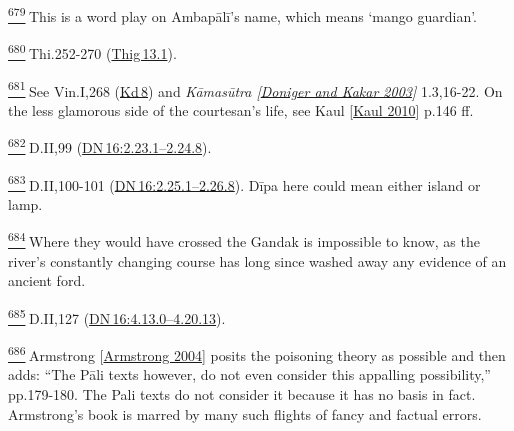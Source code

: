 \label{footprints_split_025.html_fn679}
\hyperref[footprints_split_017.htmlux5cux23fnref679]{\textsuperscript{679}} This
is a word play on Ambapālī's name, which means `mango guardian'.

\label{footprints_split_025.html_fn680}
\hyperref[footprints_split_017.htmlux5cux23fnref680]{\textsuperscript{680}} Thi.252-270
(\href{https://suttacentral.net/thig13.1/en/sujato}{Thig\,13.1}).

\label{footprints_split_025.html_fn681}
\hyperref[footprints_split_017.htmlux5cux23fnref681]{\textsuperscript{681}} See
Vin.I,268
(\href{https://suttacentral.net/pli-tv-kd8/en/brahmali}{Kd\,8}) and
\emph{{Kāmasūtra
{{[}\hyperref[footprints_split_023.htmlux5cux23Donigerux5cux2520andux5cux2520Kakarux5cux25202003]{Doniger
and Kakar 2003}{]}}}} 1.3,16-22. On the less glamorous side of the
courtesan's life, see {Kaul
{{[}\hyperref[footprints_split_022.htmlux5cux23Kaulux5cux25202010]{Kaul
2010}{]}}} p.146 ff.

\label{footprints_split_025.html_fn682}
\hyperref[footprints_split_017.htmlux5cux23fnref682]{\textsuperscript{682}} D.II,99
(\href{https://suttacentral.net/dn16/en/sujato\#2.23.1}{DN\,16:2.23.1--2.24.8}).

\label{footprints_split_025.html_fn683}
\hyperref[footprints_split_017.htmlux5cux23fnref683]{\textsuperscript{683}} D.II,100-101
(\href{https://suttacentral.net/dn16/en/sujato\#2.25.1}{DN\,16:2.25.1--2.26.8}).
Dīpa here could mean either island or lamp.

\label{footprints_split_025.html_fn684}
\hyperref[footprints_split_017.htmlux5cux23fnref684]{\textsuperscript{684}} Where
they would have crossed the Gandak is impossible to know, as the river's
constantly changing course has long since washed away any evidence of an
ancient ford.

\label{footprints_split_025.html_fn685}
\hyperref[footprints_split_017.htmlux5cux23fnref685]{\textsuperscript{685}} D.II,127
(\href{https://suttacentral.net/dn16/en/sujato\#4.13.0}{DN\,16:4.13.0--4.20.13}).

\label{footprints_split_025.html_fn686}
\hyperref[footprints_split_017.htmlux5cux23fnref686]{\textsuperscript{686}} {Armstrong
{{[}\hyperref[footprints_split_022.htmlux5cux23Armstrongux5cux25202004]{Armstrong
2004}{]}}} posits the poisoning theory as possible and then adds: ``The
Pāli texts however, do not even consider this appalling possibility,''
pp.179-180. The Pali texts do not consider it because it has no basis in
fact. Armstrong's book is marred by many such flights of fancy and
factual errors.

